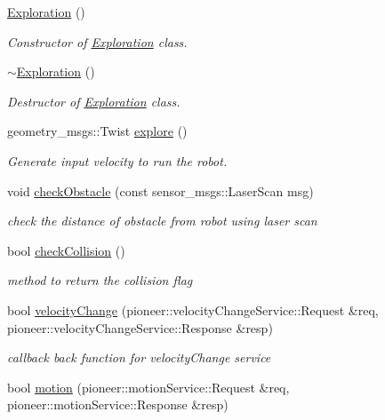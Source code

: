 \begin{DoxyCompactItemize}
\item 
\hyperlink{class_exploration_a517cb54e02d8f50ce339c7873fa1c3ad}{Exploration} ()
\begin{DoxyCompactList}\small\item\em Constructor of \hyperlink{class_exploration}{Exploration} class. \end{DoxyCompactList}\item 
\hyperlink{class_exploration_af96bdb6781a4f8fd2cbd859b1d9caeff}{$\sim$\+Exploration} ()
\begin{DoxyCompactList}\small\item\em Destructor of \hyperlink{class_exploration}{Exploration} class. \end{DoxyCompactList}\item 
geometry\+\_\+msgs\+::\+Twist \hyperlink{class_exploration_a5731c746e60f32a51a2ae1d1f7863f89}{explore} ()
\begin{DoxyCompactList}\small\item\em Generate input velocity to run the robot. \end{DoxyCompactList}\item 
void \hyperlink{class_exploration_a3e5225a667c5522ed5f2eb69c9a9b937}{check\+Obstacle} (const sensor\+\_\+msgs\+::\+Laser\+Scan msg)
\begin{DoxyCompactList}\small\item\em check the distance of obstacle from robot using laser scan \end{DoxyCompactList}\item 
bool \hyperlink{class_exploration_a127a714f733627f1a7d4f8554961ea00}{check\+Collision} ()
\begin{DoxyCompactList}\small\item\em method to return the collision flag \end{DoxyCompactList}\item 
bool \hyperlink{class_exploration_ae25024189aa54ae2be10877c22c0142c}{velocity\+Change} (pioneer\+::velocity\+Change\+Service\+::\+Request \&req, pioneer\+::velocity\+Change\+Service\+::\+Response \&resp)
\begin{DoxyCompactList}\small\item\em callback back function for velocity\+Change service \end{DoxyCompactList}\item 
bool \hyperlink{class_exploration_adc86a3300d43090957adcdd3250c73fe}{motion} (pioneer\+::motion\+Service\+::\+Request \&req, pioneer\+::motion\+Service\+::\+Response \&resp)

\end{DoxyCompactItemize}
